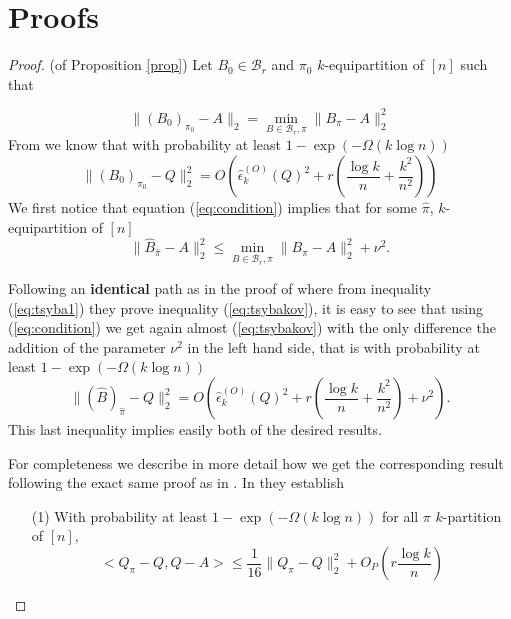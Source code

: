 \documentclass[12pt]{article}
\begin{document}
\section{Proofs}

\begin{proof} (of Proposition \ref{prop})
Let $B_0 \in \mathcal{B}_r $ and  $\pi_0$ $k$-equipartition of $[n]$ such that 

\begin{equation}\label{eq:tsyba1}
\|(B_0)_{\pi_0}-A\|_2=\min_{B \in \mathcal{B}_r,\pi}\|B_{\pi} -A\|_2^2
\end{equation} 
From \cite{TsybK} we know that with probability at least $1-\exp\left(-\Omega(k \log n)\right)$
\begin{equation}\label{eq:tsybakov}
\|(B_0)_{\pi_0}-Q\|_2^2 =O\left(\hat{\epsilon}_k^{(O)}(Q)^2+r\left(\frac{\log k}{n}+\frac{k^2}{n^2}\right) \right)
\end{equation}
We first notice that equation (\ref{eq:condition}) implies that for some $\hat{\pi}$, $k$-equipartition of $[n]$ \begin{equation}\label{eq:us}
\|\hat{B}_{\hat{\pi}}-A\|_2^2 \leq \min_{B \in \mathcal{B}_r,\pi}\|B_{\pi} -A\|_2^2 +\nu^2.
\end{equation}


Following an \textbf{identical} path as in the proof of \cite{TsybK} where from inequality (\ref{eq:tsyba1}) they prove inequality (\ref{eq:tsybakov}), it is easy to see that using (\ref{eq:condition}) we get again almost (\ref{eq:tsybakov}) with the only difference the addition of the parameter $\nu^2$ in the left hand side, that is with probability at least $1-\exp\left(-\Omega(k \log n)\right)$ \begin{equation}\label{eq:target}
\|(\hat{B})_{\hat{\pi}}-Q\|_2^2 =O\left(\hat{\epsilon}_k^{(O)}(Q)^2+r\left(\frac{\log k}{n}+\frac{k^2}{n^2}\right)+\nu^2 \right).
\end{equation} This last inequality implies easily both of the desired results.

For completeness we describe in more detail how we get the corresponding result following the exact same proof as in \cite{TsybK}. In \cite{TsybK} they establish 
\begin{itemize}
\item[(1)] With probability at least $1-\exp\left(-\Omega(k \log n)\right)$ for all $\pi$ $k$-partition of $[n]$,
\begin{equation}\label{eq:24}
<Q_{\pi}-Q,Q-A> \leq \frac{1}{16}\|Q_{\pi}-Q\|_2^2+O_P \left( r \frac{\log k}{n}\right)
\end{equation}


\end{itemize}
\end{proof}
\end{document}
